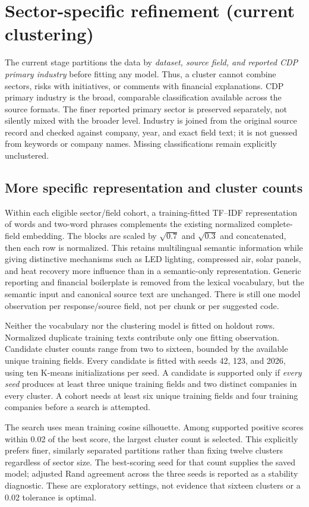 \documentclass[11pt,a4paper]{article}
\begin{document}
\section{Sector-specific refinement (current clustering)}
The current stage partitions the data by \emph{dataset, source field, and
reported CDP primary industry} before fitting any model. Thus, a cluster
cannot combine sectors, risks with initiatives, or comments with financial
explanations. CDP primary industry is the broad, comparable classification
available across the source formats. The finer reported primary sector is
preserved separately, not silently mixed with the broader level. Industry is
joined from the original source record and checked against company, year,
and exact field text; it is not guessed from keywords or company names.
Missing classifications remain explicitly unclustered.

\subsection{More specific representation and cluster counts}
Within each eligible sector/field cohort, a training-fitted TF--IDF
representation of words and two-word phrases complements the existing
normalized complete-field embedding. The blocks are scaled by
$\sqrt{0.7}$ and $\sqrt{0.3}$ and concatenated, then each row is normalized.
This retains multilingual semantic information while giving distinctive
mechanisms such as LED lighting, compressed air, solar panels, and heat
recovery more influence than in a semantic-only representation.
Generic reporting and financial boilerplate is removed from the lexical
vocabulary, but the semantic input and canonical source text are unchanged.
There is still one model observation per response/source field, not per
chunk or per suggested code.

Neither the vocabulary nor the clustering model is fitted on holdout rows.
Normalized duplicate training texts contribute only one fitting observation.
Candidate cluster counts range from two to sixteen, bounded by the available
unique training fields. Every candidate is fitted with seeds 42, 123, and
2026, using ten K-means initializations per seed. A candidate is supported
only if \emph{every seed} produces at least three unique training fields and
two distinct companies in every cluster. A cohort needs at least six unique
training fields and four training companies before a search is attempted.

The search uses mean training cosine silhouette. Among supported positive
scores within 0.02 of the best score, the largest cluster count is selected.
This explicitly prefers finer, similarly separated partitions rather than
fixing twelve clusters regardless of sector size. The best-scoring seed for
that count supplies the saved model; adjusted Rand agreement across the
three seeds is reported as a stability diagnostic. These are exploratory
settings, not evidence that sixteen clusters or a 0.02 tolerance is optimal.
\end{document}
